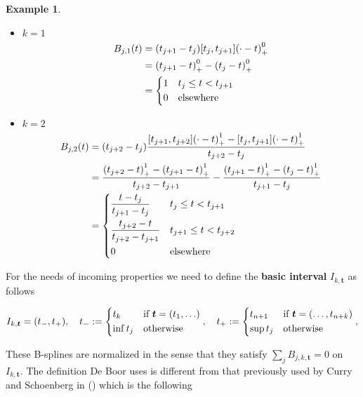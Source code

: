 \documentclass[a4paper, 11pt]{article}
\newtheorem{example}{Example}
\begin{document}
\begin{example}
  \begin{itemize}
    \item \underline{$k=1$}
      \begin{align*}
        B_{j,1}(t) &= (t_{j+1}-t_j)[t_j, t_{j+1}]{(\cdot-t)}_+^0 \\
        &= {(t_{j+1}-t)}_+^0 - {(t_j-t)}_+^0 \\
        &= \begin{dcases} 1 & t_j \leq t < t_{j+1} \\ 0 & \text{elsewhere} \end{dcases}
      \end{align*}
    \item \underline{$k=2$}
      \begin{align*}
        B_{j,2}(t) &= (t_{j+2}-t_j)\frac{[t_{j+1}, t_{j+2}]{(\cdot-t)}_+^1-[t_{j}, 
        t_{j+1}]{(\cdot-t)}_+^1}{t_{j+2}-t_j}\\
        &= \frac{{(t_{j+2}-t)}_+^1-{(t_{j+1}-t)}_+^1}{t_{j+2}-t_{j+1}}- 
        \frac{{(t_{j+1}-t)}_+^1-{(t_{j}-t)}_+^1}{t_{j+1}-t_{j}} \\
        &= 
        \begin{dcases}
          \frac{t-t_j}{t_{j+1}-t_j} & t_j \leq t < t_{j+1} \\
          \frac{t_{j+2}-t}{t_{j+2}-t_{j+1}} & t_{j+1} \leq t < t_{j+2} \\
          0 & \text{elsewhere} 
        \end{dcases}
    \end{align*}
\end{itemize}
\end{example}

For the needs of incoming properties we need to define the \textbf{basic interval} $I_{k, \bm{t}}$  as follows

\begin{equation}
  I_{k, \bm{t}} = (t_-, t_+), \quad t_- := \begin{dcases} t_k & \text{if} \ \bm{t} = (t_1, \ldots) \\ \inf t_j & 
\text{otherwise} \end{dcases}, \quad t_+ := \begin{dcases} t_{n+1} & \text{if} \ \bm{t} = (\ldots, t_{n+k}) \\ \sup t_j 
& \text{otherwise} \end{dcases}, \end{equation}

These B-splines are normalized in the sense that they satisfy $\sum_{j} B_{j,k, \bm{t}} = 0$ on $I_{k, \bm{t}}$. The 
definition De Boor uses is different from that previously used by Curry and Schoenberg in (\cite{CS66}) which is the 
following
\end{document}
